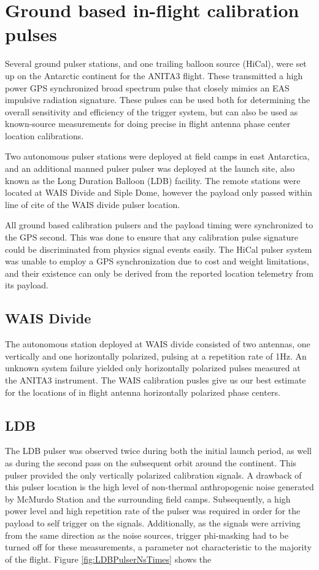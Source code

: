 \section{Ground based in-flight calibration pulses}
	Several ground pulser stations, and one trailing balloon source (HiCal), were set up on the Antarctic continent for the ANITA3 flight.  These transmitted a high power GPS synchronized broad spectrum pulse that closely mimics an EAS impulsive radiation signature.  These pulses can be used both for determining the overall sensitivity and efficiency of the trigger system, but can also be used as known-source measurements for doing precise in flight antenna phase center location calibrations.
	
	Two autonomous pulser stations were deployed at field camps in east Antarctica, and an additional manned pulser pulser was deployed at the launch site, also known as the Long Duration Balloon (LDB) facility.  The remote stations were located at WAIS Divide and Siple Dome, however the payload only passed within line of cite of the WAIS divide pulser location. 
	
	All ground based calibration pulsers and the payload timing were synchronized to the GPS second.  This was done to ensure that any calibration pulse signature could be discriminated from physics signal events easily.  The HiCal pulser system was unable to employ a GPS synchronization due to cost and weight limitations, and their existence can only be derived from the reported location telemetry from its payload.
	
	\subsection{WAIS Divide}
		The autonomous station deployed at WAIS divide consisted of two antennas, one vertically and one horizontally polarized, pulsing at a repetition rate of 1Hz.  An unknown system failure yielded only horizontally polarized pulses measured at the ANITA3 instrument.  The WAIS calibration pusles give us our best estimate for the locations of in flight antenna horizontally polarized phase centers.

	\subsection{LDB}
		The LDB pulser was observed twice during both the initial launch period, as well as during the second pass on the subsequent orbit around the continent.  This pulser provided the only vertically polarized calibration signals.  A drawback of this pulser location is the high level of non-thermal anthropogenic noise generated by McMurdo Station and the surrounding field camps.  Subsequently, a high power level and high repetition rate of the pulser was required in order for the payload to self trigger on the signals.  Additionally, as the signals were arriving from the same direction as the noise sources, trigger phi-masking had to be turned off for these measurements, a parameter not characteristic to the majority of the flight.  Figure \ref{fig:LDBPulserNsTimes} shows the 
		
